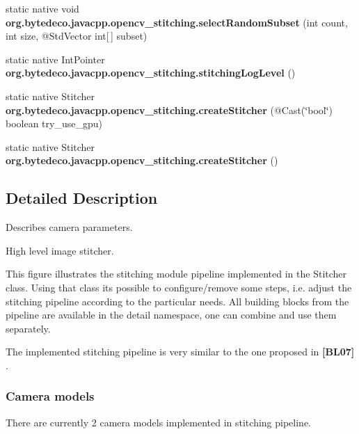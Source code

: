 \begin{DoxyCompactItemize}
\item 
\mbox{\label{group__stitching_gabeab870f5610bf0e4f79cdcf9e0a4b6d}} 
static native void {\bfseries org.\+bytedeco.\+javacpp.\+opencv\+\_\+stitching.\+select\+Random\+Subset} (int count, int size, @Std\+Vector int\mbox{[}$\,$\mbox{]} subset)
\item 
\mbox{\label{group__stitching_ga986597ffca49e8fe31dfbf9ead6da54a}} 
static native Int\+Pointer {\bfseries org.\+bytedeco.\+javacpp.\+opencv\+\_\+stitching.\+stitching\+Log\+Level} ()
\item 
\mbox{\label{group__stitching_gaef4d75a2140cded1c24c78e5fe93363e}} 
static native Stitcher {\bfseries org.\+bytedeco.\+javacpp.\+opencv\+\_\+stitching.\+create\+Stitcher} (@Cast(\char`\"{}bool\char`\"{}) boolean try\+\_\+use\+\_\+gpu)
\item 
\mbox{\label{group__stitching_ga58b64c2423052839107c67b767241fae}} 
static native Stitcher {\bfseries org.\+bytedeco.\+javacpp.\+opencv\+\_\+stitching.\+create\+Stitcher} ()
\end{DoxyCompactItemize}


\subsection{Detailed Description}
Describes camera parameters. 

High level image stitcher.

This figure illustrates the stitching module pipeline implemented in the Stitcher class. Using that class it\textquotesingle{}s possible to configure/remove some steps, i.\+e. adjust the stitching pipeline according to the particular needs. All building blocks from the pipeline are available in the detail namespace, one can combine and use them separately. 

The implemented stitching pipeline is very similar to the one proposed in {\bfseries [B\+L07]} . 

 

\subsubsection*{Camera models }

There are currently 2 camera models implemented in stitching pipeline. 


